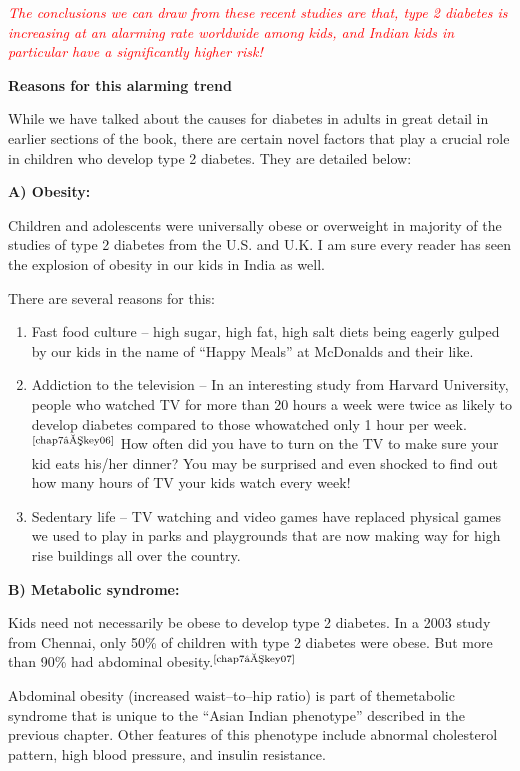 \textcolor{red}{\textit{The conclusions we can draw from these recent studies are that, type 2 diabetes is increasing at an alarming rate worldwide among kids, and Indian kids in particular have a significantly higher risk!}}

\noindent\textbf{Reasons for this alarming trend}


While we have talked about the causes for diabetes in adults in great detail in earlier sections of the book, there are certain novel factors that play a crucial role in children who develop type 2 diabetes. They are detailed below:

\noindent\textbf{A) Obesity:}

Children and adolescents were universally obese or overweight in majority of the studies of type 2 diabetes from the U.S. and U.K. I am sure every reader has seen the explosion of obesity in our kids in India as well.

\noindent There are several reasons for this:

\begin{enumerate}[•]
\itemsep=0pt
\item Fast food culture – high sugar, high fat, high salt diets being eagerly gulped by our kids in the name of “Happy Meals” at McDonalds and their like.
\item Addiction to the television – In an interesting study from Harvard University, people who watched TV for more than 20 hours a week were twice as likely to develop diabetes compared to those who\break watched only 1 hour per week.$^{\text{\cite{chap7–key06}}}$ How often did you have to turn on the TV to make sure your kid eats his/her dinner? You may be surprised and even shocked to find out how many hours of TV your kids watch every week!
\item Sedentary life – TV watching and video games have replaced physical games we used to play in parks and playgrounds that are now making way for high rise buildings all over the country.
 \end{enumerate}

\noindent\textbf{B) Metabolic syndrome:}

Kids need not necessarily be obese to develop type 2 diabetes. In a 2003 study from Chennai, only 50\% of children with type 2 diabetes were obese. But more than 90\% had abdominal obesity.$^{\text{\cite{chap7–key07}}}$

Abdominal obesity (increased waist–to–hip ratio) is part of the\break metabolic syndrome that is unique to the “Asian Indian phenotype” described in the previous chapter. Other features of this phenotype include abnormal cholesterol pattern, high blood pressure, and insulin resistance.


